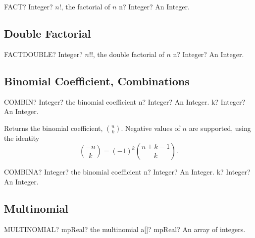 \vspace{0.6cm}
\begin{mpFunctionsExtract}
	\mpWorksheetFunctionOneNotImplemented
	{FACT? Integer?  $n!$, the factorial of $n$}
	{n? Integer? An Integer.}
\end{mpFunctionsExtract}



\subsection{Double Factorial}

\begin{mpFunctionsExtract}
	\mpWorksheetFunctionOneNotImplemented
	{FACTDOUBLE? Integer?  $n!!$, the double factorial of $n$}
	{n? Integer? An Integer.}
\end{mpFunctionsExtract}




\subsection{Binomial Coefficient, Combinations}


\vspace{0.6cm}
\begin{mpFunctionsExtract}
	\mpWorksheetFunctionTwoNotImplemented
	{COMBIN? Integer? the binomial coefficient}
	{n? Integer? An Integer.}
	{k? Integer? An Integer.}
\end{mpFunctionsExtract}

\vspace{0.3cm}
Returns the binomial coefficient, $\binom{n}{k}$. Negative values of $n$ are supported, using the identity
\begin{equation}
	\binom{-n}{k} = (-1)^k \binom{n+k-1}{k}.
\end{equation}


\vspace{0.6cm}
\begin{mpFunctionsExtract}
	\mpWorksheetFunctionTwoNotImplemented
	{COMBINA? Integer? the binomial coefficient}
	{n? Integer? An Integer.}
	{k? Integer? An Integer.}
\end{mpFunctionsExtract}




\subsection{Multinomial}

\begin{mpFunctionsExtract}
	\mpWorksheetFunctionOneNotImplemented
	{MULTINOMIAL? mpReal? the multinomial}
	{a[]? mpReal? An array of integers.}
\end{mpFunctionsExtract}

